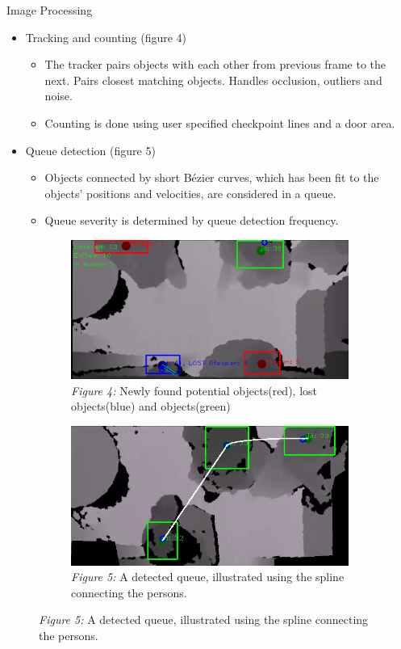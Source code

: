 \documentclass[final,hyperref={pdfpagelabels=false}]{beamer}
\begin{document}
\begin{frame}[t]
\begin{columns}[t]
\begin{column}{.465\textwidth}
\begin{block}{Image Processing}
\begin{itemize}
	\item Tracking and counting (figure 4)
	\begin{itemize}
		\item{The tracker pairs objects with each other from previous frame to the next. Pairs closest matching objects. Handles occlusion, outliers and noise.}
		\item{Counting is done using user specified checkpoint lines and a door area.}
	\end{itemize}
	
	\item Queue detection (figure 5)
	\begin{itemize}
		\item Objects connected by short Bézier curves, which has been fit to the objects' positions and velocities, are considered in a queue.
		\item Queue severity is determined by queue detection frequency.
	\end{itemize}
\end{itemize}

\begin{figure}
\begin{subfigure}{.5\textwidth}
\centering
\includegraphics[width=0.9\linewidth]{trackingExample.png}
\caption{\centering \textit{Figure 4:} Newly found potential objects(red), lost 
		 objects(blue) and objects(green)}
\end{subfigure}%
\begin{subfigure}{.5\textwidth}
\centering
\includegraphics[width=0.9\linewidth]{visibleQueue.png}
\caption{\centering \textit{Figure 5:} A detected queue, illustrated using the spline connecting the persons.}
\end{subfigure}
\end{figure}


\end{block}
\end{column}
\end{columns}
\end{frame}
\end{document}
